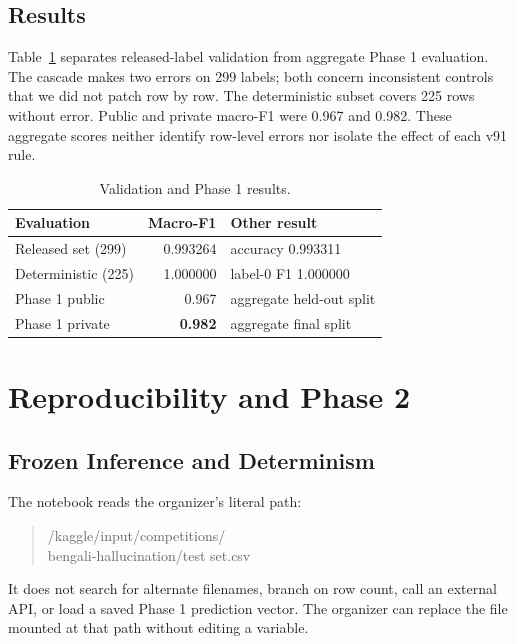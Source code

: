 \documentclass[11pt]{article}
\begin{document}
\subsection{Results}

Table~\ref{tab:results} separates released-label validation from aggregate Phase 1 evaluation. The cascade makes two errors on 299 labels; both concern inconsistent controls that we did not patch row by row. The deterministic subset covers 225 rows without error. Public and private macro-F1 were 0.967 and 0.982. These aggregate scores neither identify row-level errors nor isolate the effect of each v91 rule.

\begin{table}[t]
\caption{Validation and Phase 1 results.}
\label{tab:results}
\centering
\small
\begin{tabular}{@{}lrl@{}}
\toprule
Evaluation & Macro-F1 & Other result \\
\midrule
Released set (299) & 0.993264 & accuracy 0.993311 \\
Deterministic (225) & 1.000000 & label-0 F1 1.000000 \\
Phase 1 public & 0.967 & aggregate held-out split \\
Phase 1 private & \textbf{0.982} & aggregate final split \\
\bottomrule
\end{tabular}
\end{table}

\section{Reproducibility and Phase 2}

\subsection{Frozen Inference and Determinism}

The notebook reads the organizer's literal path:

\begin{quote}
\small\ttfamily
/kaggle/input/competitions/\\
bengali-hallucination/test set.csv
\end{quote}

It does not search for alternate filenames, branch on row count, call an external API, or load a saved Phase 1 prediction vector. The organizer can replace the file mounted at that path without editing a variable.
\end{document}
